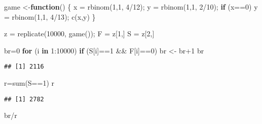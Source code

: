 \documentclass[
]{article}
\newenvironment{Shaded}{\begin{snugshade}}{\end{snugshade}}
\newcommand{\ControlFlowTok}[1]{\textcolor[rgb]{0.13,0.29,0.53}{\textbf{#1}}}
\newcommand{\DecValTok}[1]{\textcolor[rgb]{0.00,0.00,0.81}{#1}}
\newcommand{\FunctionTok}[1]{\textcolor[rgb]{0.00,0.00,0.00}{#1}}
\newcommand{\NormalTok}[1]{#1}
\newcommand{\OtherTok}[1]{\textcolor[rgb]{0.56,0.35,0.01}{#1}}
\newcommand{\SpecialCharTok}[1]{\textcolor[rgb]{0.00,0.00,0.00}{#1}}
\theoremstyle{definition}
\theoremstyle{definition}
\theoremstyle{definition}
\theoremstyle{remark}
\begin{document}
\begin{Shaded}
\begin{Highlighting}[]
\NormalTok{game }\OtherTok{\textless{}{-}}\ControlFlowTok{function}\NormalTok{() \{}
\NormalTok{x }\OtherTok{=} \FunctionTok{rbinom}\NormalTok{(}\DecValTok{1}\NormalTok{,}\DecValTok{1}\NormalTok{, }\DecValTok{4}\SpecialCharTok{/}\DecValTok{12}\NormalTok{);}
\NormalTok{y }\OtherTok{=} \FunctionTok{rbinom}\NormalTok{(}\DecValTok{1}\NormalTok{,}\DecValTok{1}\NormalTok{, }\DecValTok{2}\SpecialCharTok{/}\DecValTok{10}\NormalTok{);}
\ControlFlowTok{if}\NormalTok{ (x}\SpecialCharTok{==}\DecValTok{0}\NormalTok{)}
\NormalTok{y }\OtherTok{=} \FunctionTok{rbinom}\NormalTok{(}\DecValTok{1}\NormalTok{,}\DecValTok{1}\NormalTok{, }\DecValTok{4}\SpecialCharTok{/}\DecValTok{13}\NormalTok{);}
\FunctionTok{c}\NormalTok{(x,y)}
\NormalTok{\}}

\NormalTok{z }\OtherTok{=} \FunctionTok{replicate}\NormalTok{(}\DecValTok{10000}\NormalTok{, }\FunctionTok{game}\NormalTok{());}
\NormalTok{F }\OtherTok{=}\NormalTok{ z[}\DecValTok{1}\NormalTok{,]}
\NormalTok{S }\OtherTok{=}\NormalTok{ z[}\DecValTok{2}\NormalTok{,]}

\NormalTok{br}\OtherTok{=}\DecValTok{0}
\ControlFlowTok{for}\NormalTok{ (i }\ControlFlowTok{in} \DecValTok{1}\SpecialCharTok{:}\DecValTok{10000}\NormalTok{)}
\ControlFlowTok{if}\NormalTok{ (S[i]}\SpecialCharTok{==}\DecValTok{1} \SpecialCharTok{\&\&}\NormalTok{ F[i]}\SpecialCharTok{==}\DecValTok{0}\NormalTok{)}
\NormalTok{br }\OtherTok{\textless{}{-}}\NormalTok{ br}\SpecialCharTok{+}\DecValTok{1}
\NormalTok{br}
\end{Highlighting}
\end{Shaded}

\begin{verbatim}
## [1] 2116
\end{verbatim}

\begin{Shaded}
\begin{Highlighting}[]
\NormalTok{r}\OtherTok{=}\FunctionTok{sum}\NormalTok{(S}\SpecialCharTok{==}\DecValTok{1}\NormalTok{)}
\NormalTok{r}
\end{Highlighting}
\end{Shaded}

\begin{verbatim}
## [1] 2782
\end{verbatim}

\begin{Shaded}
\begin{Highlighting}[]
\NormalTok{br}\SpecialCharTok{/}\NormalTok{r}
\end{Highlighting}
\end{Shaded}
\end{document}
